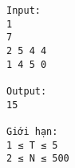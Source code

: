 \begin{verbatim}
Input:
1
7
2 5 4 4
1 4 5 0

Output:
15

Giới hạn:
1 ≤ T ≤ 5 
2 ≤ N ≤ 500 
\end{verbatim}